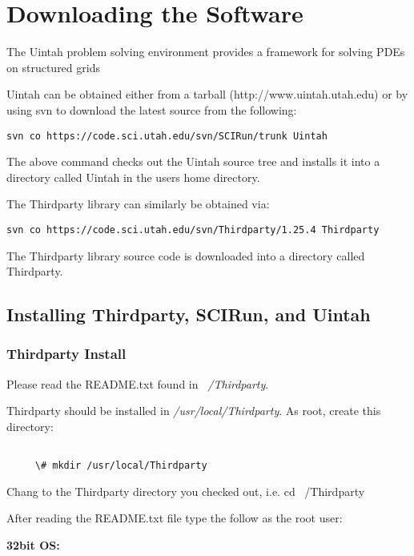 \section{Downloading the Software} \label{Sec:download}

The Uintah problem solving environment provides a framework for solving PDEs on structured grids

Uintah can be obtained either from a tarball (http://www.uintah.utah.edu) or by using svn to download the latest source from the following:

\begin{verbatim}
svn co https://code.sci.utah.edu/svn/SCIRun/trunk Uintah
\end{verbatim}

The above command checks out the Uintah source tree and installs it
into a directory called Uintah in the users home directory.

The Thirdparty library can similarly be obtained via:
\begin{verbatim}
svn co https://code.sci.utah.edu/svn/Thirdparty/1.25.4 Thirdparty
\end{verbatim}

The Thirdparty library source code is downloaded into a directory
called Thirdparty.

\subsection{Installing Thirdparty, SCIRun, and Uintah}

\subsubsection{Thirdparty Install}


Please read the README.txt found in \emph{~/Thirdparty}.

Thirdparty should be installed in \emph{/usr/local/Thirdparty}.  As
root, create this directory:

\begin{verbatim}

     \# mkdir /usr/local/Thirdparty

\end{verbatim}

Chang to the Thirdparty directory you checked out, i.e. cd ~/Thirdparty

After reading the README.txt file type the follow as the root user:

\textbf{32bit OS:}

